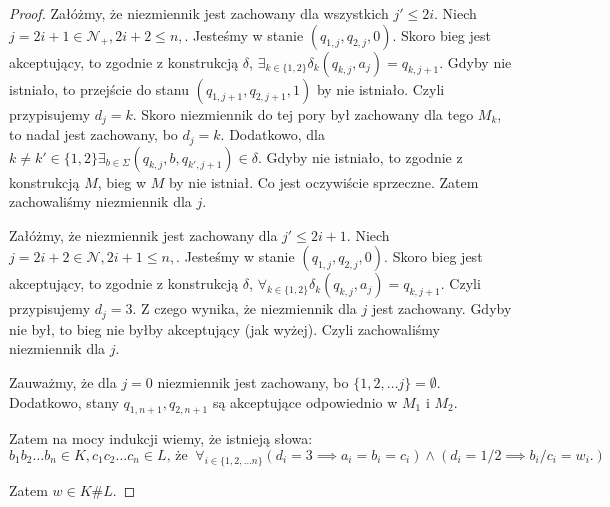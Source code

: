 \documentclass{article}
\theoremstyle{definition}
\theoremstyle{remark}
\begin{document}
\begin{proof}
    Załóżmy, że niezmiennik jest zachowany dla wszystkich \(j' \leq 2i\). Niech \(j=2i+1 \in
    \mathcal{N}_+, 2i+2 \leq n,\). Jesteśmy w stanie \( \left(q_{1,j}, q_{2,j}, 0
    \right) \). Skoro bieg jest akceptujący, to zgodnie z konstrukcją \(\delta\),
    \( \exists _{k \in \{1,2\}} \delta_k(q_{k,j}, a_j) = q_{k, j+1} \). Gdyby nie istniało, to 
    przejście do stanu \( \left(q_{1,j+1}, q_{2,j+1},1\right) \) by nie istniało.
    Czyli przypisujemy \(d_j = k\). Skoro niezmiennik do tej pory był zachowany dla tego \(M_k\),
    to nadal jest zachowany, bo \(d_j = k\).
    Dodatkowo, dla \(k \neq k' \in \{1,2\} \exists_{b \in \Sigma} (q_{k,j}, b, q_{k',j+1}) \in \delta\).
    Gdyby nie istniało, to zgodnie z konstrukcją \(M\), bieg w \(M\) by nie istniał. Co jest oczywiście sprzeczne.
    Zatem zachowaliśmy niezmiennik dla \(j\).

    Załóżmy, że niezmiennik jest zachowany dla \(j' \leq 2i+1\). Niech \(j=2i+2 \in
    \mathcal{N}, 2i+1 \leq n,\). Jesteśmy w stanie \( \left(q_{1,j}, q_{2,j}, 0
    \right) \). Skoro bieg jest akceptujący, to zgodnie z konstrukcją \(\delta\),
    \( \forall _{k \in \{1,2\}} \delta_k(q_{k,j}, a_j) = q_{k, j+1} \). Czyli
    przypisujemy \(d_j = 3\). Z czego wynika, że niezmiennik dla \(j\) jest zachowany.
    Gdyby nie był, to bieg nie byłby akceptujący (jak wyżej). 
    Czyli zachowaliśmy niezmiennik dla \(j\).
    
    Zauważmy, że dla \(j = 0\) niezmiennik jest zachowany, bo \(\{1, 2, \ldots j\} = \emptyset\).
    Dodatkowo, stany \(q_{1, n+1}, q_{2, n+1}\) są akceptujące odpowiednio w \(M_1\) i \(M_2\).

    Zatem na mocy indukcji wiemy, że istnieją słowa:
    \[ b_1 b_2 \ldots b_n \in K, c_1 c_2 \ldots c_n \in L \text{, że } \ \forall_{i \in \{1,2,\ldots n\}} \left( d_i = 3 \implies a_i = b_i = c_i \right) \land \left( d_i = 1/2 \implies b_i/c_i = w_i. \right) \]

    Zatem \(w \in K \# L\).

\end{proof}
\end{document}
